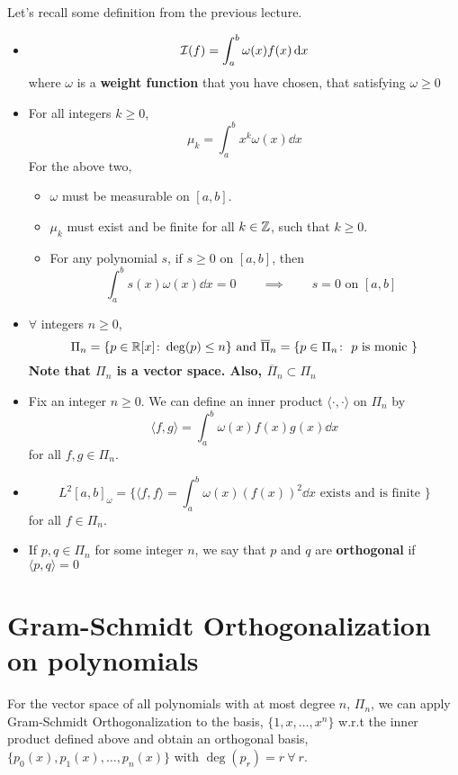 
Let's recall some definition from the previous lecture.
\begin{defn}
  \begin{itemize}
    \label{apr11a:defn:recall}    
    \hfill
    \item
    \[
      \mathcal{I}(f) = \int_a^b \omega(x) f(x) \dd{x}
    \]
    where $\omega$ is a \textbf{weight function} that you have chosen, that satisfying $\omega \geq 0$
    \item For all integers $k \geq 0$,
    \[
      \mu_k = \int_a^b x^k \omega(x) \dd{x}
    \]
    For the above two,
    \begin{itemize}
      \item
        $\omega$ must be measurable on $[a, b]$.
        
      \item
        $\mu_k$ must exist and be finite for all $k \in \mathbb{Z}$, such that $k \geq 0$.
      
      \item
        For any polynomial $s$, if $s \geq 0$ on $[a, b]$, then
        \[
          \int_a^b s(x) \omega(x) \dd{x} = 0
          \qquad \implies \qquad
          s = 0 \text{ on $[a, b]$ }
        \]
      \end{itemize}
    \item $\forall$ integers $n \geq 0$,
    \[
      \Pi_n = \{p \in \mathbb{R}[x] \colon \deg(p) \leq n \}
    \text{ and }
      \overline{\Pi}_n = \{p \in \Pi_n \colon \text{ $p$ is monic } \}
    \]
    \textbf{Note that $\Pi_n$ is a vector space. Also, $\overline{\Pi}_n \subset \Pi_n$}
    \item Fix an integer $n \geq 0$.  
    We can define an inner product $\langle \cdot , \cdot \rangle$  on $\Pi_n$ by
    \[
      \langle f, g \rangle = \int_a^b \omega(x) f(x) g(x) \dd{x}
    \]
    for all $f, g \in \Pi_n$.
    \item  \[
      L^2[a, b]_\omega = \{\langle f, f \rangle = \int_a^b \omega(x) \left(f(x)\right)^2 \dd{x} \text{ exists and is finite } \}
    \]
    for all $f \in \Pi_n$.
    \item If $p, q \in \Pi_n$ for some integer $n$, we say that $p$ and $q$ are \textbf{orthogonal} if $\langle p, q \rangle = 0$
    
  \end{itemize}

\end{defn}

\section{Gram-Schmidt Orthogonalization on polynomials}
For the vector space of all polynomials with at most degree $n$, $\Pi_n$, we can apply Gram-Schmidt Orthogonalization to the basis, $ \{1,x,\ldots,x^n\} $ w.r.t the inner product defined above and obtain an orthogonal basis, $ \{p_0(x), p_1(x), \ldots, p_n(x) \}$ with $ \deg(p_r) = r \ \forall \ r $.\\ 

